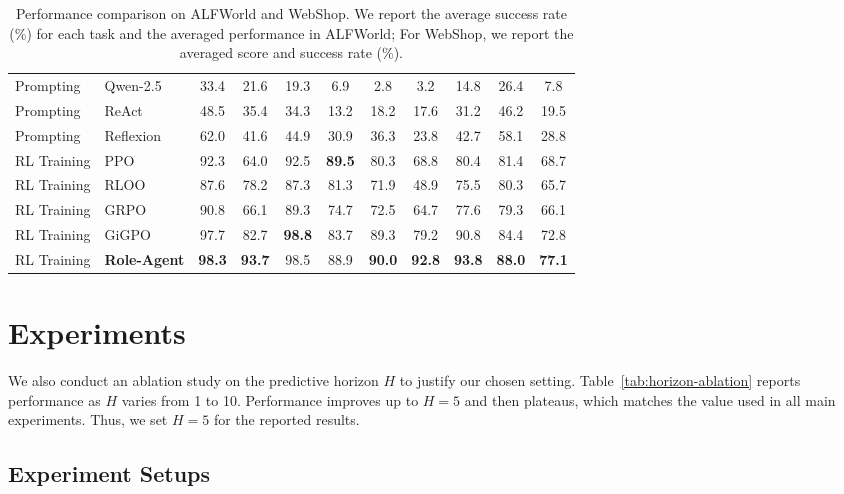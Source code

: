 \documentclass{llmxive}
\begin{document}
\begin{table}[t]
\begin{center}
{\begin{tabular}{ll|ccccccccc}
Prompting & Qwen-2.5 & 33.4 & 21.6 & 19.3 & 6.9 & 2.8 & 3.2 & \multicolumn{1}{c|}{14.8} & 26.4 & 7.8 \\
Prompting & ReAct & 48.5 & 35.4 & 34.3 & 13.2 & 18.2 & 17.6 & \multicolumn{1}{c|}{31.2} & 46.2 & 19.5 \\
Prompting & Reflexion & 62.0 & 41.6 & 44.9 & 30.9 & 36.3 & 23.8 & \multicolumn{1}{c|}{42.7} & 58.1 & 28.8 \\
RL Training & PPO & 92.3 & 64.0 & 92.5 & \textbf{89.5} & 80.3 & 68.8 & \multicolumn{1}{c|}{80.4} & 81.4 & 68.7 \\
RL Training & RLOO & 87.6 & 78.2 & 87.3 & 81.3 & 71.9 & 48.9 & \multicolumn{1}{c|}{75.5} & 80.3 & 65.7 \\
RL Training & GRPO & 90.8 & 66.1 & 89.3 & 74.7 & 72.5 & 64.7 & \multicolumn{1}{c|}{77.6} & 79.3 & 66.1 \\
RL Training & GiGPO & 97.7 & 82.7 & \textbf{98.8} & 83.7 & 89.3 & 79.2 & \multicolumn{1}{c|}{90.8} & 84.4 & 72.8 \\
\rowcolor{gray!10}
RL Training & \textbf{Role-Agent} & \textbf{98.3} & \textbf{93.7} & 98.5 & 88.9  & \textbf{90.0} & \textbf{92.8} & \multicolumn{1}{c|}{\textbf{93.8}} & \textbf{88.0} & \textbf{77.1} \\ 
\bottomrule[1pt] 
\end{tabular}} 
\vspace{-0.2cm}
\caption{Performance comparison on ALFWorld and WebShop. We report the average success rate (\%) for each task and the averaged performance in ALFWorld; For WebShop, we report the averaged score and success rate (\%).}\label{tab:1}
\end{center}
\vspace{-0.3cm} 
\end{table}

\section{Experiments}

We also conduct an ablation study on the predictive horizon $H$ to justify our chosen setting.
Table~\ref{tab:horizon-ablation} reports performance as $H$ varies from 1 to 10.
Performance improves up to $H=5$ and then plateaus, which matches the value used in all main experiments.
Thus, we set $H=5$ for the reported results.
\subsection{Experiment Setups}
\end{document}
